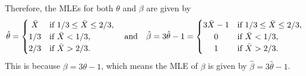 \documentclass[10pt]{article}
\begin{document}
Therefore, the MLEs for both \(\theta\) and \(\beta\) are given by 
\begin{align*}
    \hat{\theta} 
    = \begin{cases}
        \hfil \bar{X} & \text{if \(1/3 \le \bar{X} \le 2/3\)}, \\
        1/3 & \text{if \(\bar{X} < 1/3\)}, \\
        2/3 & \text{if \(\bar{X} > 2/3\)}.
    \end{cases}
    ~~~\text{and}~~~
    \hat{\beta}
    = 3 \hat{\theta} - 1
    = \begin{cases}
        3\bar{X} - 1 & \text{if \(1/3 \le \bar{X} \le 2/3\)}, \\
        \hfil 0 & \text{if \(\bar{X} < 1/3\)}, \\
        \hfil 1 & \text{if \(\bar{X} > 2/3\)}.
    \end{cases}
\end{align*}
This is because \(\beta = 3 \theta - 1\), which means the MLE of \(\beta\) is given by \(\hat{\beta} = 3 \hat{\theta} - 1\).
\end{document}
